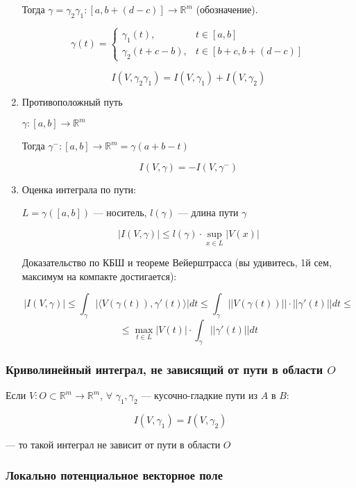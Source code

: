 \documentclass{article}
\def\dbl{\,\,}
\def\sk#1#2{\langle #1, #2 \rangle}
\begin{document}
\begin{enumerate}
    Тогда $\gamma = \gamma_2\gamma_1: [a, b + (d - c)] \rightarrow \mathbb{R}^m$ (обозначение).

    \[\gamma(t) = \begin{cases}
        \gamma_1(t), & t \in [a, b]\\
        \gamma_2(t + c - b), & t \in [b + c, b + (d - c)]
    \end{cases}\]

    \[I(V, \gamma_2\gamma_1) = I(V, \gamma_1) + I(V, \gamma_2)\]

    \item Противоположный путь
    
    $\gamma: [a, b] \rightarrow \mathbb{R}^m$

    Тогда $\gamma^-: [a, b] \rightarrow \mathbb{R}^m = \gamma(a + b - t)$

    \[I(V, \gamma) = -I(V, \gamma^-)\]

    \item Оценка интеграла по пути:
    
    $L = \gamma([a, b])$ --- носитель, $l(\gamma)$ --- длина пути $\gamma$

    \[\left|I(V, \gamma)\right| \le l(\gamma) \cdot \sup_{x \in L} |V(x)|\]

    Доказательство по КБШ и теореме Вейерштрасса (вы удивитесь, 1й сем, максимум на компакте достигается):

    \[\left|I(V, \gamma)\right| \le \int_{\gamma} |\sk{V(\gamma(t))}{\gamma'(t)}| dt \le \int_{\gamma} ||V(\gamma(t))|| \cdot ||\gamma'(t)|| dt \le \]
    \[\le \max_{t \in L} |V(t)| \cdot \int_{\gamma} ||\gamma'(t)|| dt\]
\end{enumerate}

\subsubsection{Криволинейный интеграл, не зависящий от пути в области $O$}

Если $V: O \subset \mathbb{R}^m \rightarrow \mathbb{R}^m$, $\forall \dbl \gamma_1, \gamma_2$ --- кусочно-гладкие пути из $A$ в $B$:

\[I(V, \gamma_1) = I(V, \gamma_2)\]

--- то такой интеграл не зависит от пути в области $O$

\subsubsection{Локально потенциальное векторное поле}
\end{document}

